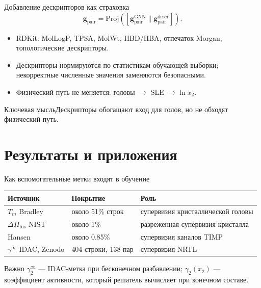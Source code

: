 \documentclass[aspectratio=169,10pt]{beamer}
\newcommand{\keybox}[1]{\begin{block}{Ключевая мысль}#1\end{block}}
\newcommand{\tightitems}{\setlength{\itemsep}{0.25em}}
\begin{document}
\begin{frame}{Добавление дескрипторов как страховка}
  \small
  \[
    \mathbf{g}_{\mathrm{pair}}
    =
    \mathrm{Proj}([\mathbf{g}_{\mathrm{pair}}^{\mathrm{GNN}}\|
    \mathbf{g}_{\mathrm{pair}}^{\mathrm{descr}}]).
  \]
  \begin{itemize}\tightitems
    \item RDKit: MolLogP, TPSA, MolWt, HBD/HBA, отпечаток Morgan, топологические дескрипторы.
    \item Дескрипторы нормируются по статистикам обучающей выборки; некорректные численные значения заменяются безопасными.
    \item Физический путь не меняется: головы $\to$ SLE $\to \ln x_2$.
  \end{itemize}
  \keybox{Дескрипторы обогащают вход для голов, но не обходят физический путь.}
\end{frame}

\section{Результаты и приложения}

\begin{frame}{Как вспомогательные метки входят в обучение}
  \small
  \begin{tabularx}{\textwidth}{lYY}
    \toprule
    \textbf{Источник} & \textbf{Покрытие} & \textbf{Роль}\\
    \midrule
    $T_m$ Bradley & около 51\% строк & супервизия кристаллической головы\\
    $\Delta H_{\mathrm{fus}}$ NIST & около 1\% & разреженная супервизия кристалла\\
    Hansen & около 0.85\% & супервизия каналов TIMP\\
    $\gamma^\infty$ IDAC, Zenodo & 404 строки, 138 пар & супервизия NRTL\\
    \bottomrule
  \end{tabularx}
  \vspace{0.5em}
  \begin{block}{Важно}
    $\gamma_2^\infty$ — IDAC-метка при бесконечном разбавлении; $\gamma_2(x_2)$ — коэффициент активности, который решатель вычисляет при конечном составе.
  \end{block}
\end{frame}
\end{document}

